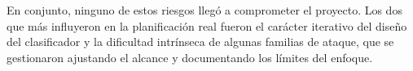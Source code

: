 En conjunto, ninguno de estos riesgos llegó a comprometer el proyecto. Los dos que más influyeron en la planificación real fueron el carácter iterativo del diseño del clasificador y la dificultad intrínseca de algunas familias de ataque, que se gestionaron ajustando el alcance y documentando los límites del enfoque.
